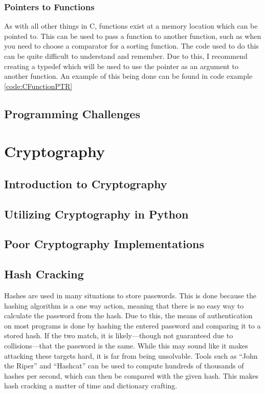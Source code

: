 \documentclass[a4paper,11pt]{report}
\begin{document}
		\subsection{Pointers to Functions}
			As with all other things in C, functions exist at a memory location which can be pointed to. 
			This can be used to pass a function to another function, such as when you need to choose a comparator for a sorting function. 
			The code used to do this can be quite difficult to understand and remember. 
			Due to this, I recommend creating a typedef which will be used to use the pointer as an argument to another function. 
			An example of this being done can be found in code example \ref{code:CFunctionPTR}	
			\begin{code}
				C}]{./CFunctionPTR.c}
				\caption{Example of a C Function Pointers}
				\label{code:CFunctionPTR}
			\end{code}
	\section{Programming Challenges}
\chapter{Cryptography}
	\label{ch:Cryptography}
	\section{Introduction to Cryptography}
	\section{Utilizing Cryptography in Python}
	\section{Poor Cryptography Implementations}
	\section{Hash Cracking}
		Hashes are used in many situations to store passwords. 
		This is done because the hashing algorithm is a one way action, meaning that there is no easy way to calculate the password from the hash. 
		Due to this, the means of authentication on most programs is done by hashing the entered password and comparing it to a stored hash. 
		If the two match, it is likely---though not guaranteed due to collisions---that the password is the same. 
		While this may sound like it makes attacking these targets hard, it is far from being unsolvable. 
		Tools such as ``John the Riper'' and ``Hashcat'' can be used to compute hundreds of thousands of hashes per second, which can then be compared with the given hash. 
		This makes hash cracking a matter of time and dictionary crafting. 
\end{document}
